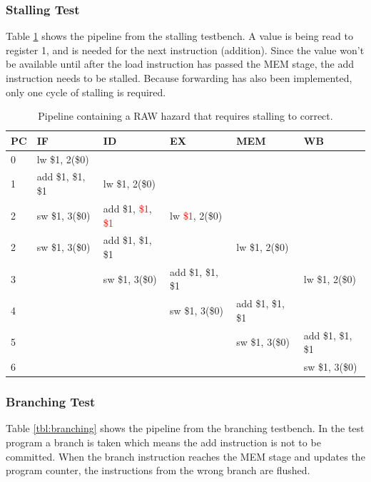 \subsubsection{Stalling Test}
Table \ref{tbl:stalling} shows the pipeline from the stalling testbench.
A value is being read to register 1, and is needed for the next instruction (addition).
Since the value won't be available until after the load instruction has passed the MEM stage,
the add instruction needs to be stalled.
Because forwarding has also been implemented, only one cycle of stalling is required.
\begin{table}[h]
    \begin{tabular}{l|lllll}
    PC & IF                & ID                & EX                & MEM               & WB                \\ \hline
    0  & lw \$1, 2(\$0)    & ~                 & ~                 & ~                 & ~                 \\
    1  & add \$1, \$1, \$1 & lw \$1, 2(\$0)    & ~                 & ~                 & ~                 \\
        2  & sw \$1, 3(\$0)    & add \$1, \textcolor{red}{\$1}, \textcolor{red}{\$1} & lw \textcolor{red}{\$1}, 2(\$0)    & ~                 & ~                 \\
    2  & sw \$1, 3(\$0)    & add \$1, \$1, \$1 & ~                 & lw \$1, 2(\$0)    & ~                 \\
    3  & ~                 & sw \$1, 3(\$0)    & add \$1, \$1, \$1 & ~                 & lw \$1, 2(\$0)    \\
    4  & ~                 & ~                 & sw \$1, 3(\$0)    & add \$1, \$1, \$1 & ~                 \\
    5  & ~                 & ~                 & ~                 & sw \$1, 3(\$0)    & add \$1, \$1, \$1 \\
    6  & ~                 & ~                 & ~                 & ~                 & sw \$1, 3(\$0)    \\
    \end{tabular}
\caption{Pipeline containing a RAW hazard that requires stalling to correct.}
\label{tbl:stalling}
\end{table}

\subsubsection{Branching Test}
Table \ref{tbl:branching} shows the pipeline from the branching testbench.
In the test program a branch is taken which means the add instruction is not to be committed.
When the branch instruction reaches the MEM stage and updates the program counter,
the instructions from the wrong branch are flushed.

